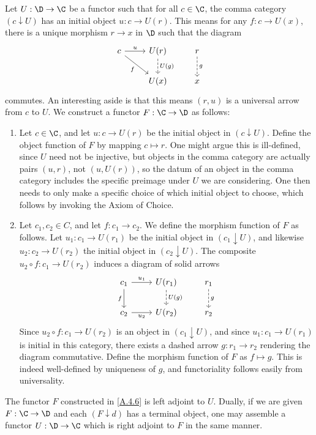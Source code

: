 \begin{remark}\label{A.4.6}
    Let $U:\D\to\C$ be a functor such that for all $c\in\C$, the comma category $(c\downarrow U)$ has an initial object $u : c\to U(r)$. This means for any $f : c\to U(x)$, there is a unique morphism $r\to x$ in $\D$ such that the diagram
    \[\begin{tikzcd}
	c & {U(r)} & r \\
	& {U(x)} & x
	\arrow["u", from=1-1, to=1-2]
	\arrow["f"', from=1-1, to=2-2]
	\arrow["{U(g)}", dashed, from=1-2, to=2-2]
	\arrow["g", dashed, from=1-3, to=2-3]
    \end{tikzcd}\]
    commutes. An interesting aside is that this means $(r,u)$ is a universal arrow from $c$ to $U$. We construct a functor $F:\C\to\D$ as follows:
    \begin{enumerate}
    \item Let $c\in\C$, and let $u:c\to U(r)$ be the initial object in $(c\downarrow U)$. Define the object function of $F$ by mapping $c\mapsto r$. One might argue this is ill-defined, since $U$ need not be injective, but objects in the comma category are actually pairs $(u,r)$, not $(u,U(r))$, so the datum of an object in the comma category includes the specific preimage under $U$ we are considering. One then needs to only make a specific choice of which initial object to choose, which follows by invoking the Axiom of Choice.
        \item Let $c_1,c_2\in C$, and let $f : c_1\to c_2$. We define the morphism function of $F$ as follows. Let $u_1 : c_1\to U(r_1)$ be the initial object in $(c_1\downarrow U)$, and likewise $u_2:c_2\to U(r_2)$ the initial object in $(c_2\downarrow U)$. The composite $u_2\circ f : c_1\to U(r_2)$ induces a diagram of solid arrows
        \[\begin{tikzcd}
	{c_1} & {U(r_1)} & {r_1} \\
	{c_2} & {U(r_2)} & {r_2}
	\arrow["{u_1}", from=1-1, to=1-2]
	\arrow["f"', from=1-1, to=2-1]
	\arrow["{U(g)}", dashed, from=1-2, to=2-2]
	\arrow["g", dashed, from=1-3, to=2-3]
	\arrow["{u_2}"', from=2-1, to=2-2]
    \end{tikzcd}\]
    Since $u_2\circ f : c_1\to U(r_2)$ is an object in $(c_1\downarrow U)$, and since $u_1 : c_1\to U(r_1)$ is initial in this category, there exists a dashed arrow $g : r_1\to r_2$ rendering the diagram commutative. Define the morphism function of $F$ as $f\mapsto g$. This is indeed well-defined by uniqueness of $g$, and functoriality follows easily from universality.
    \end{enumerate}
\end{remark}

\begin{proposition}\label{A.4.7}
    The functor $F$ constructed in \cref{A.4.6} is left adjoint to $U$. Dually, if we are given $F:\C\to\D$ and each $(F\downarrow d)$ has a terminal object, one may assemble a functor $U:\D\to\C$ which is right adjoint to $F$ in the same manner.
\end{proposition}